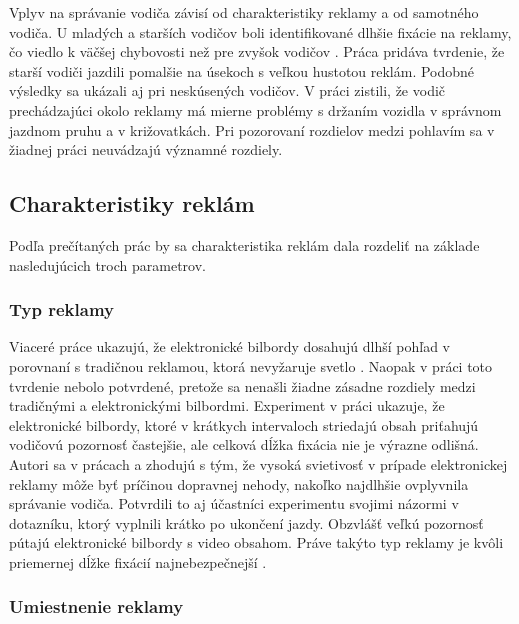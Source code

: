 Vplyv na správanie vodiča závisí od charakteristiky reklamy a od samotného vodiča. U mladých a starších vodičov boli identifikované dlhšie fixácie na reklamy, čo viedlo k väčšej chybovosti než pre zvyšok vodičov \cite{stavrinos2016visual,EDQUIST2011619}. Práca \cite{horberry200813} pridáva tvrdenie, že starší vodiči jazdili pomalšie na úsekoch s veľkou hustotou reklám. Podobné výsledky sa ukázali aj pri neskúsených vodičov. V práci \cite{bendak2010role} zistili, že vodič prechádzajúci okolo reklamy má mierne problémy s držaním vozidla v správnom jazdnom pruhu a v križovatkách. Pri pozorovaní rozdielov medzi pohlavím sa v žiadnej práci neuvádzajú významné rozdiely.

\subsection{Charakteristiky reklám}

Podľa prečítaných prác by sa charakteristika reklám dala rozdeliť  na základe nasledujúcich troch parametrov.

\subsubsection{Typ reklamy}

Viaceré práce ukazujú, že elektronické bilbordy dosahujú dlhší pohľad v porovnaní s tradičnou reklamou, ktorá nevyžaruje svetlo \cite{OVIEDOTRESPALACIOS201985, beijer, brome}. Naopak v práci \cite{n1} toto tvrdenie nebolo potvrdené, pretože sa nenašli žiadne zásadne rozdiely medzi tradičnými a elektronickými bilbordmi. Experiment v práci \cite{brome} ukazuje, že elektronické bilbordy, ktoré v krátkych intervaloch striedajú obsah priťahujú vodičovú pozornosť častejšie, ale celková dĺžka fixácia nie je výrazne odlišná. Autori sa v prácach \cite{mollu2018driving} a \cite{beijer} zhodujú s tým, že vysoká svietivosť v prípade elektronickej reklamy môže byť príčinou dopravnej nehody, nakoľko najdlhšie ovplyvnila správanie vodiča. Potvrdili to aj účastníci experimentu svojimi názormi v dotazníku, ktorý vyplnili krátko po ukončení jazdy. Obzvlášť veľkú pozornosť pútajú elektronické bilbordy s video obsahom. Práve takýto typ reklamy je kvôli priemernej dĺžke fixácií najnebezpečnejší \cite{yellappan2016exposure, smiley2005traffic}.

\subsubsection{Umiestnenie reklamy}

